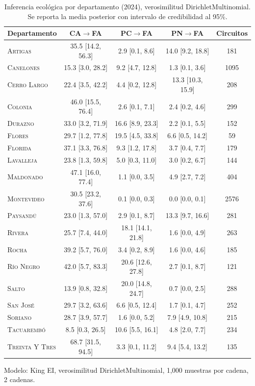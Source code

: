 
\begin{table}[htbp]
\centering
\caption{Inferencia ecológica por departamento (2024), verosimilitud DirichletMultinomial. Se reporta la media posterior con intervalo de credibilidad al 95\%.}
\label{tab:dept_dm_2024}
\small
\begin{tabular}{lcccc}
\toprule
Departamento & CA$\to$FA & PC$\to$FA & PN$\to$FA & Circuitos \\
\midrule
\textsc{Artigas} & 35.5 [14.2, 56.3] & 2.9 [0.1, 8.6] & 14.0 [9.2, 18.8] & 181 \\
\textsc{Canelones} & 15.3 [3.0, 28.2] & 9.2 [4.7, 12.8] & 1.3 [0.1, 3.6] & 1095 \\
\textsc{Cerro Largo} & 22.4 [3.5, 42.2] & 4.4 [0.2, 12.8] & 13.3 [10.3, 15.9] & 208 \\
\textsc{Colonia} & 46.0 [15.5, 76.4] & 2.6 [0.1, 7.1] & 2.4 [0.2, 4.6] & 299 \\
\textsc{Durazno} & 33.0 [3.2, 71.9] & 16.6 [8.9, 23.3] & 2.2 [0.1, 5.5] & 152 \\
\textsc{Flores} & 29.7 [1.2, 77.8] & 19.5 [4.5, 33.8] & 6.6 [0.5, 14.2] & 59 \\
\textsc{Florida} & 37.1 [3.3, 76.8] & 9.3 [1.2, 17.8] & 3.7 [0.4, 7.7] & 179 \\
\textsc{Lavalleja} & 23.8 [1.3, 59.8] & 5.0 [0.3, 11.0] & 3.0 [0.2, 6.7] & 144 \\
\textsc{Maldonado} & 47.1 [16.0, 77.4] & 1.1 [0.0, 3.5] & 4.9 [2.7, 7.2] & 404 \\
\textsc{Montevideo} & 30.5 [23.2, 37.6] & 0.1 [0.0, 0.3] & 0.0 [0.0, 0.1] & 2576 \\
\textsc{Paysandú} & 23.0 [1.3, 57.0] & 2.9 [0.1, 8.7] & 13.3 [9.7, 16.6] & 281 \\
\textsc{Rivera} & 25.7 [7.4, 44.0] & 18.1 [14.1, 21.8] & 1.6 [0.0, 4.9] & 263 \\
\textsc{Rocha} & 39.2 [5.7, 76.0] & 3.4 [0.2, 8.9] & 1.6 [0.0, 4.6] & 185 \\
\textsc{Río Negro} & 42.0 [5.7, 83.3] & 20.6 [12.6, 27.8] & 2.7 [0.1, 8.7] & 121 \\
\textsc{Salto} & 13.9 [0.8, 32.8] & 20.0 [14.8, 24.7] & 0.7 [0.0, 2.5] & 288 \\
\textsc{San José} & 29.7 [3.2, 63.6] & 6.6 [0.5, 12.4] & 1.7 [0.1, 4.7] & 252 \\
\textsc{Soriano} & 28.7 [3.9, 57.7] & 1.6 [0.0, 5.2] & 7.9 [4.9, 10.8] & 215 \\
\textsc{Tacuarembó} & 8.5 [0.3, 26.5] & 10.6 [5.5, 16.1] & 4.8 [2.0, 7.7] & 234 \\
\textsc{Treinta Y Tres} & 68.7 [31.5, 94.5] & 3.3 [0.1, 11.2] & 9.4 [5.4, 13.2] & 135 \\
\bottomrule
\end{tabular}
\begin{tablenotes}\small
\item Modelo: King EI, verosimilitud DirichletMultinomial, 1{,}000 muestras por cadena, 2 cadenas.
\end{tablenotes}
\end{table}
